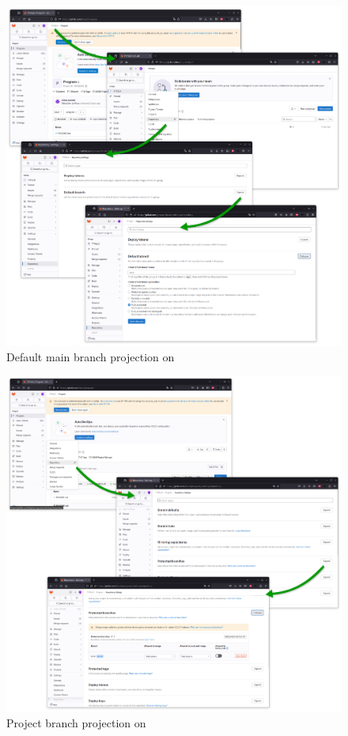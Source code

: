 \begin{figure}[!p]
\includegraphics[width=1.0\textwidth,keepaspectratio=true,draft=\ddst]{img/hosts/gitlab/dbranch.eps} 
\caption{Default main branch projection on \gitlab\label{mbgitlab}}
\end{figure}

\begin{figure}[!p]
\includegraphics[width=1.0\textwidth,keepaspectratio=true,draft=\ddst]{img/hosts/gitlab/branch.eps} 
\caption{Project branch projection on \gitlab\label{bpgitlab}}
\end{figure}

